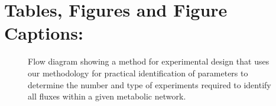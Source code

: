 \documentclass[10pt]{article}
\begin{document}
	\printbibliography
	
	\clearpage
	\section{Tables, Figures and Figure Captions:}
	
	
	\begin{figure}[!tbhp]
		\caption{Flow diagram showing a method for experimental design that uses our methodology for practical identification of parameters to determine the number and type of experiments required to identify all fluxes within a given metabolic network.}\label{fig:ident-design}
	\end{figure}

	
\end{document}

